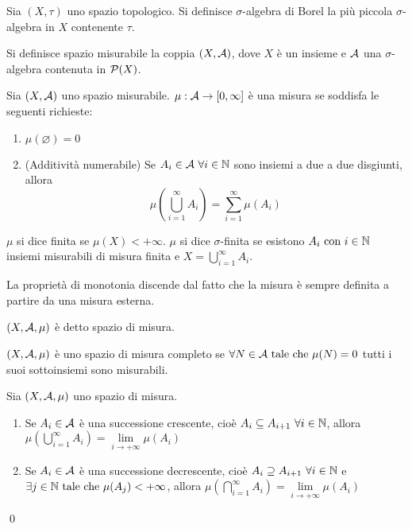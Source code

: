 \begin{definition}
	Sia $(X,\tau)$ uno spazio topologico. Si definisce $\sigma$-algebra di Borel la più piccola $\sigma$-algebra in $X$ contenente $\tau$.
\end{definition}

\begin{definition}
	Si definisce spazio misurabile la coppia $(X,\mathcal{A})$, dove $X$ è un insieme e $\mathcal{A}$ una $\sigma$-algebra contenuta in $\mathcal{P}(X)$.
\end{definition}

\begin{definition}
	[Misura]
	Sia $(X,\mathcal{A})$ uno spazio misurabile. $\mu:\mathcal{A} \to [0,\infty]$ è una misura se soddisfa le seguenti richieste:
	\begin{enumerate}
		\item $\mu(\varnothing)=0$
		\item (Additività numerabile) Se $A_i \in \mathcal{A} \ \forall i \in \mathbb{N}$ sono insiemi a due a due disgiunti, allora $$\displaystyle\mu\left(\bigcup_{i=1}^\infty A_i \right) = \sum_{i=1}^\infty \mu(A_i)$$
	\end{enumerate}
	$\mu$ si dice finita se $\mu(X)<+\infty$. $\mu$ si dice $\sigma$-finita se esistono $A_i \text{ con } i \in \mathbb{N}$ insiemi misurabili di misura finita e $X=\bigcup\limits_{i=1}^\infty A_i$.
\end{definition}

\begin{remark}
	La proprietà di monotonia discende dal fatto che la misura è sempre definita a partire da una misura esterna.
\end{remark}

\begin{definition}
	$(X,\mathcal{A},\mu)$ è detto spazio di misura.
\end{definition}

\begin{definition}
	$(X,\mathcal{A},\mu)$ è uno spazio di misura completo se $\forall N \in \mathcal{A} \text{ tale che } \mu(N)=0$ tutti i suoi sottoinsiemi sono misurabili.
\end{definition}

\begin{theorem}
	Sia $(X,\mathcal{A},\mu)$ uno spazio di misura.
	\begin{enumerate}
		\item Se $A_i \in \mathcal{A}$ è una successione crescente, cioè $A_i \subseteq A_{i+1} \ \forall i \in \mathbb{N}$, allora $\mu\left(\bigcup\limits_{i=1}^\infty A_i\right) = \lim\limits_{i\to + \infty}\mu(A_i)$
		\item Se $A_i \in \mathcal{A}$ è una successione decrescente, cioè $A_i \supseteq A_{i+1} \ \forall i \in \mathbb{N}$ e $\exists j \in \mathbb{N} \text{ tale che } \mu(A_j) < + \infty$, allora $\mu\left(\bigcap\limits_{i=1}^\infty A_i\right)=\lim\limits_{i\to +\infty}\mu(A_i)$
	\end{enumerate}
	\qed
\end{theorem}

